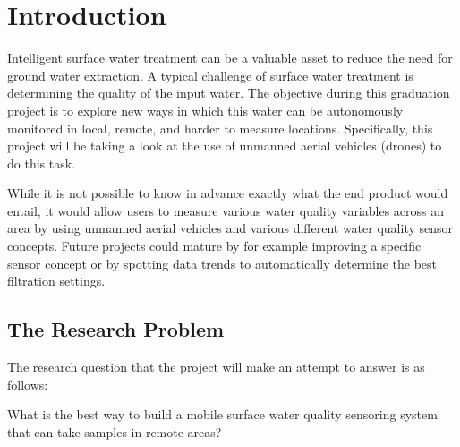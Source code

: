 \newpage
\section{Introduction}
Intelligent surface water treatment can be a valuable asset to reduce the need for ground water extraction. A typical challenge of surface water treatment is determining the quality of the input water. The objective during this graduation project is to explore new ways in which this water can be autonomously monitored in local, remote, and harder to measure locations. Specifically, this project will be taking a look at the use of unmanned aerial vehicles (drones) to do this task. 

While it is not possible to know in advance exactly what the end product would entail, it would allow users to measure various water quality variables across an area by using unmanned aerial vehicles and various different water quality sensor concepts. Future projects could mature by for example improving a specific sensor concept or by spotting data trends to automatically determine the best filtration settings.

\subsection{The Research Problem}

The research question that the project will make an attempt to answer is as follows:\vspace{3mm}

\large{What is the best way to build a mobile surface water quality sensoring system that can take samples in remote areas?}\vspace{3mm}\\
\normalsize